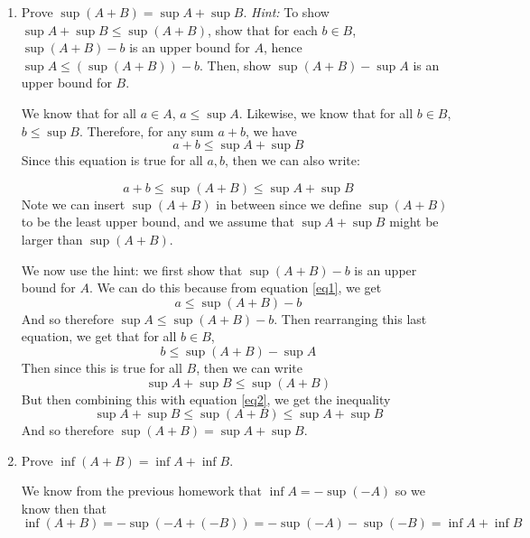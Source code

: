 \documentclass[10pt]{article}
\begin{document}
    \begin{enumerate}[label=(\alph*)]
        \item Prove $\sup(A + B) = \sup A + \sup B$. \textit{Hint:} To show $\sup A + \sup B \le \sup(A + B)$, show that for each $b \in B$, $\sup(A + B) - b$ is an upper bound for $A$, hence $\sup A \le (\sup (A + B)) - b$. Then, show $\sup(A + B) - \sup A$ is an upper bound for $B$.
        
        \begin{solution}
            We know that for all $a \in A$, $a \le \sup A$. Likewise, we know that for all $b \in B$, $b \le \sup B$. Therefore, for any sum $a+b$, we have 
            \begin{equation} \label{eq1}
                a + b \le \sup A + \sup B
            \end{equation}
            Since this equation is true for all $a, b$, then we can also write:

            \begin{equation}\label{eq2}
                a + b \le \sup(A + B) \le \sup A + \sup B
            \end{equation}
            Note we can insert $\sup(A +B)$ in between since we define $\sup(A +B)$ to be the least upper bound, and we assume that $\sup A + \sup B$ might be larger than $\sup(A + B)$. 
            
            We now use the hint: we first show that $\sup(A + B) - b$ is an upper bound for $A$. We can do this because from equation \ref{eq1}, we get 
            \[ a \le \sup (A+B) - b\]
            And so therefore $\sup A \le \sup(A + B) - b$. Then rearranging this last equation, we get that for all $b \in B$,
            \[ b \le \sup(A + B) - \sup A\]
            Then since this is true for all $B$, then we can write
            \[ \sup A + \sup B \le \sup(A + B)\] 
            But then combining this with equation \ref{eq2}, we get the inequality
            \[ \sup A + \sup B \le \sup(A + B) \le \sup A + \sup B\] 
            And so therefore $\sup(A + B) = \sup A + \sup B$.
        \end{solution}
        \item Prove $\inf (A + B) = \inf A + \inf B$.

        \begin{solution}
            We know from the previous homework that $\inf A = -\sup(-A)$ so we know then that $\inf(A + B) = -\sup(-A + (-B)) = -\sup(-A) - \sup(-B) = \inf A + \inf B$
        \end{solution}
    \end{enumerate}
\end{document}

